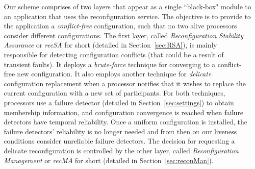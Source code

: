 \documentclass[11pt]{article}
\begin{document}
 Our scheme comprises of two layers that appear as a single ``black-box" module to an application that uses the reconfiguration service. The objective is to provide to the application a {\em conflict-free} configuration,
such that no two alive processors consider different configurations. The first layer, called {\em Reconfiguration Stability Assurance} or {\em recSA} for short (detailed in Section~\ref{sec:RSA}), is mainly responsible for detecting configuration conflicts (that could be a result of transient faults). It deploys a {\em brute-force} technique for converging to a conflict-free new configuration. 
It also employs another technique for {\em delicate} configuration replacement when a processor notifies that it wishes to replace the current configuration with a new set of participants. 
For both techniques, processors use a failure detector (detailed in Section~\ref{sec:settings}) to obtain membership information, and configuration convergence is reached when failure detectors have temporal reliability. 
Once a uniform configuration is installed, the failure detectors' reliability is no longer needed and from then on our liveness conditions consider unreliable failure detectors.  
The decision for requesting a delicate reconfiguration is controlled by the other layer, called {\em Reconfiguration Management} or {\em recMA} for short (detailed in Section~\ref{sec:reconMan}).
\end{document}
